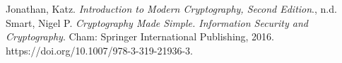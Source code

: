 \documentclass[11pt,openany]{article}
\begin{document}
\vfill
\begin{thebibliography}{9}\large
	Jonathan, Katz. \textit{Introduction to Modern Cryptography, Second Edition}., n.d.
	Smart, Nigel P. \textit{Cryptography Made Simple. Information Security and Cryptography}. Cham: Springer International Publishing, 2016. https://doi.org/10.1007/978-3-319-21936-3.
	
	
\end{thebibliography}

\newpage
\appendix
%
%
\end{document}
